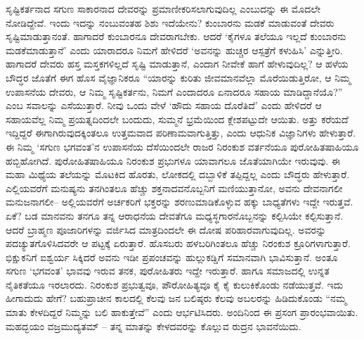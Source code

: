 ಸೃಷ್ಟಿಕರ್ತನಾದ ಸಗುಣ ಸಾಕಾರನಾದ ದೇವರನ್ನು ಪ್ರಮಾಣೀಕರಿಸಲಾಗುವುದಿಲ್ಲ ಎಂಬುದನ್ನು ಈ ಮೊದಲೇ ನೋಡಿದ್ದೇವೆ. ಇಂದು ಇದನ್ನು ನಂಬುವಂತಹ ಶಿಶು ಇದೆಯೇನು? ಕುಂಬಾರನು ಮಡಕೆ ಮಾಡುವಂತೆ ದೇವರು ಸೃಷ್ಟಿಮಾಡುತ್ತಾನಂತೆ. ಹಾಗಾದರೆ ಕುಂಬಾರನೂ ದೇವರಾಗಬೇಕು. ಆದರೆ ‘ಕೈಗಳೂ ತಲೆಯೂ ಇಲ್ಲದೆ ಕುಂಬಾರನು ಮಡಕೆಮಾಡುತ್ತಾನೆ’ ಎಂದು ಯಾರಾದರೂ ನಿಮಗೆ ಹೇಳಿದರೆ ‘ಅವನನ್ನು ಹುಚ್ಚರ ಆಸ್ಪತ್ರೆಗೆ ಕಳುಹಿಸಿ’ ಎನ್ನುತ್ತೀರಿ. ಹಾಗಾದರೆ ದೇವರು ಹಸ್ತ ಮಸ್ತಕಗಳಿಲ್ಲದೆ ಸೃಷ್ಟಿ ಮಾಡುತ್ತಾನೆ, ಎಂದಾಗ ನೀವೇಕೆ ಹಾಗೆ ಹೇಳುವುದಿಲ್ಲ? ಆ ಹಳೆಯ ಬೌದ್ಧರ ಜೊತೆಗೆ ಈಗ ಹೊಸ ವೈಜ್ಞಾನಿಕರೂ “ಯಾರನ್ನು ಕುರಿತು ಜೀವಮಾನವೆಲ್ಲಾ ಮೊರೆಯಿಡುತ್ತಿರೋ, ಆ ನಿಮ್ಮ ಉಪಾಸನೆಯ ದೇವರು, ಆ ನಿಮ್ಮ ಸೃಷ್ಟಿಕರ್ತನು, ನಿಮಗೆ ಎಂದಾದರೂ ಏನಾದರೂ ಸಹಾಯ ಮಾಡಿದ್ದಾನೆಯೊ?” ಎಂಬ ಸವಾಲನ್ನು ಎಸೆಯುತ್ತಾರೆ. ನೀವು ಒಂದು ವೇಳೆ ‘ಹೌದು ಸಹಾಯ ದೊರೆತಿದೆ’ ಎಂದು ಹೇಳಿದರೆ ಆ ಸಹಾಯವೆಲ್ಲ ನಿಮ್ಮ ಪ್ರಯತ್ನದಿಂದಲೇ ಬಂದುದು, ಸುಮ್ಮನೆ ಭ್ರಮೆಯಿಂದ ಕ್ಲೇಶಪಟ್ಟುದೇ ಆಯಿತು. ಅತ್ತು ಕರೆಯದೆ ಇದ್ದಿದ್ದರೆ ಈಗಾಗಿರುವುದಕ್ಕಿಂತಲೂ ಉತ್ತಮವಾದ ಪರಿಣಾಮವಾಗುತ್ತಿತ್ತು, ಎಂದು ಆಧುನಿಕ ವಿಜ್ಞಾನಿಗಳು ಹೇಳುತ್ತಾರೆ. ಈ ನಿಮ್ಮ ‘ಸಗುಣ ಭಗವಂತ’ನ ಉಪಾಸನೆಯ ದೆಸೆಯಿಂದಲೇ ರಾಜರ ನಿರಂಕುಶ ವರ್ತನೆಯೂ ಪುರೋಹಿತಷಾಹಿಯೂ ಹಬ್ಬಿಹೋಗಿದೆ. ಪುರೋಹಿತಷಾಹಿಯೂ ನಿರಂಕುಶ ಪ್ರಭುಗಳೂ ಯಾವಾಗಲೂ ಜೊತೆಯಾಗಿಯೇ ಇರುವುವು. ಈ ಮಹಾ ಮಿಥ್ಯೆಯ ತಲೆಯನ್ನು ಮೊಟಕಿದ ಹೊರತು, ಲೋಕದಲ್ಲಿ ದಬ್ಬಾಳಿಕೆ ತಪ್ಪಿದ್ದಲ್ಲ ಎಂದು ಬೌದ್ಧರು ಹೇಳುತ್ತಾರೆ. ಎಲ್ಲಿಯವರೆಗೆ ಮನುಷ್ಯನು ತನಗಿಂತಲೂ ಹೆಚ್ಚು ಶಕ್ತನಾದವನೊಬ್ಬನಿಗೆ ಮಣಿಯುತ್ತಾನೋ, ಅವನು ದೇವನಾಗಲೀ ಮನುಜನಾಗಲೀ– ಅಲ್ಲಿಯವರೆಗೆ ಅರ್ಚಕರಿಗೆ ಭಕ್ತರನ್ನು ಶರಣುಮಾಡಿಕೊಳ್ಳುವ ಹಕ್ಕು ಬಾಧ್ಯತೆಗಳು ಇದ್ದೇ ಇರುತ್ತವೆ. ಏಕೆ? ಬಡ ಮಾನವನು ತನಗೂ ತನ್ನ ಆರಾಧನೆಯ ದೇವತೆಗೂ ಮಧ್ಯಸ್ಥಗಾರನೊಬ್ಬನನ್ನು ಕಲ್ಪಿಸಿಯೇ ಕಲ್ಪಿಸುತ್ತಾನೆ. ಆದರೆ ಬ್ರಾಹ್ಮಣ ಪೂಜಾರಿಗಳನ್ನು ವರ್ಜಿಸಿದ ಮಾತ್ರದಿಂದಲೇ ಈ ದೋಷ ಪರಿಹಾರವಾಗುವುದಿಲ್ಲ. ಅವರನ್ನು ಪದಚ್ಯುತಗೊಳಿಸಿದವರೇ ಆ ಪಟ್ಟಕ್ಕೆ ಏರುತ್ತಾರೆ. ಹೊಸಬರು ಹಳಬರಿಗಿಂತಲೂ ಹೆಚ್ಚು ನಿರಂಕುಶ ಕ್ರೂರಿಗಳಾಗುತ್ತಾರೆ. ಭಿಕ್ಷುಕನಿಗೆ ಐಶ್ವರ್ಯ ಸಿಕ್ಕಿದರೆ ಅವನು ಇಡೀ ಪ್ರಪಂಚವನ್ನು ಹುಲ್ಲುಕಡ್ಡಿಗೆ ಸಮಾನವಾಗಿ ಭಾವಿಸುತ್ತಾನೆ. ಅಂತೂ ಸಗುಣ ‘ಭಗವಂತ’ ಭಾವವು ಇರುವ ತನಕ, ಪುರೋಹಿತರು ಇದ್ದೇ ಇರುತ್ತಾರೆ. ಹಾಗೂ ಸಮಾಜದಲ್ಲಿ ಉನ್ನತ ನೈತಿಕತೆಯೂ ಇರಲಾರದು. ನಿರಂಕುಶ ಪ್ರಭುತ್ವವೂ, ಪೌರೋಹಿತ್ಯವೂ ಕೈ ಕೈ ಕುಲುಕಿಕೊಂಡು ನಡೆಯುತ್ತವೆ. ಇದು ಹೀಗಾದುದು ಹೇಗೆ? ಬಹುಪ್ರಾಚೀನ ಕಾಲದಲ್ಲಿ ಕೆಲವು ಜನ ಬಲಿಷ್ಠರು ಕೆಲವು ಅಬಲರನ್ನು ಹಿಡಿದುಕೊಂಡು “ನಮ್ಮ ಮಾತು ಕೇಳದಿದ್ದರೆ ನಿಮ್ಮನ್ನು ಬಲಿ ಹಾಕುತ್ತೇವೆ” ಎಂದು ಆರ್ಭಟಿಸಿದರು. ಅಂದಿನಿಂದ ಈ ಪ್ರಸಂಗ ಪ್ರಾರಂಭವಾಯಿತು. ಮಹದ್ಭಯಂ ವಜ್ರಮುದ್ಯತಮ್​ – ತನ್ನ ಮಾತನ್ನು ಕೇಳದವರನ್ನು ಕೊಲ್ಲುವ ರುದ್ರನ ಭಾವನೆಯಿದು. 

